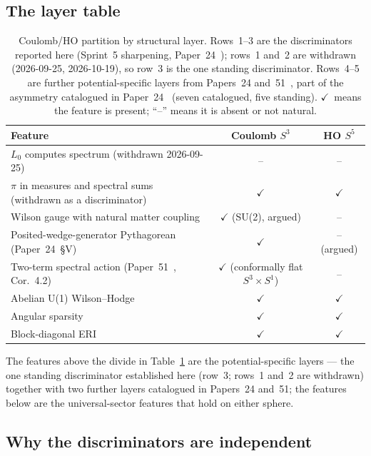 \documentclass[twocolumn,pra,amsmath,amssymb,superscriptaddress]{revtex4-2}
\begin{document}
\subsection{The layer table}

\begin{table}[h]
\caption{Coulomb/HO partition by structural layer.  Rows~1--3 are the
discriminators reported here (Sprint~5 sharpening, Paper~24~\cite{paper24});
rows~1 and~2 are withdrawn (2026-09-25, 2026-10-19), so row~3 is the
one standing discriminator.  Rows~4--5 are further potential-specific layers from
Papers~24 and~51~\cite{paper24,paper51}, part of the asymmetry
catalogued in Paper~24~\cite{paper24} (seven catalogued, five standing).
$\checkmark$~means the feature is present; ``--'' means it is absent or
not natural.}
\label{tab:five_layers}
\begin{ruledtabular}
\begin{tabular}{lcc}
Feature & Coulomb $S^3$ & HO $S^5$ \\
\hline
$L_0$ computes spectrum (withdrawn 2026-09-25) & -- & -- \\
$\pi$ in measures and spectral sums (withdrawn as a discriminator) & $\checkmark$ & $\checkmark$ \\
Wilson gauge with natural matter coupling & $\checkmark$ (SU(2), argued) & -- \\
Posited-wedge-generator Pythagorean (Paper~24~\S V) & $\checkmark$ & -- (argued) \\
Two-term spectral action (Paper~51~\cite{paper51}, Cor.~4.2) & $\checkmark$ (conformally flat $S^3 \times S^1$) & -- \\
\hline
Abelian U(1) Wilson--Hodge & $\checkmark$ & $\checkmark$ \\
Angular sparsity & $\checkmark$ & $\checkmark$ \\
Block-diagonal ERI & $\checkmark$ & $\checkmark$ \\
\end{tabular}
\end{ruledtabular}
\end{table}

The features above the divide in Table~\ref{tab:five_layers} are the
potential-specific layers --- the one standing discriminator
established here (row~3; rows~1 and~2 are withdrawn) together with two further layers
catalogued in Papers~24 and~51; the features below are the
universal-sector features that hold on either sphere.

\subsection{Why the discriminators are independent}
\end{document}
